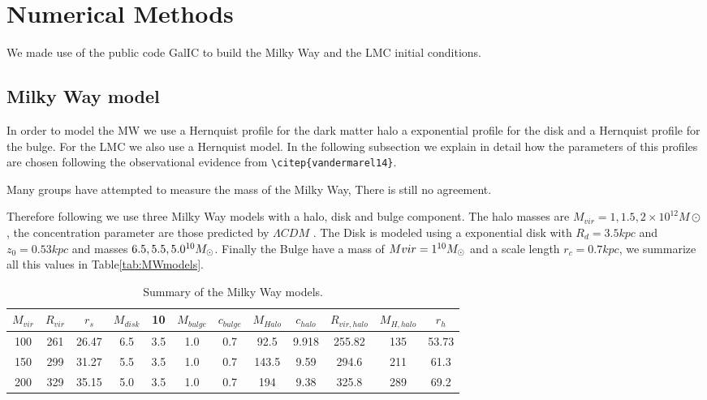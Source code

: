 \section{Numerical Methods}\label{sec:models}
We made use of the public code GalIC to build the Milky Way and the
LMC initial conditions.
\subsection{Milky Way model}


In order to model the MW we use a Hernquist profile for the dark matter halo 
a exponential profile for the disk and a Hernquist profile for the bulge. For
the LMC we also use a Hernquist model. In the following subsection we explain 
in detail how the parameters of this profiles are chosen following the observational 
evidence from \verb+\citep{vandermarel14}+. 


Many groups have attempted to measure the mass of the Milky Way,
There is still no agreement. 

Therefore following \citep{Gomez15} we use three Milky Way models with
a halo, disk and bulge component. The halo masses are $M_{vir} = 1, 1.5, 
2\times 10 ^12 M\odot$, the concentration parameter are those
predicted by $\Lambda CDM$ \citep{Kyplin}. The Disk is modeled using a 
exponential disk with $R_d=3.5kpc$ and $z_0 = 0.53 kpc$ and masses
$6.5, 5.5, 5.0 \time10^{10} M_{\odot}$.
Finally the Bulge have a mass of $Mvir=1\time10^{10}M_{\odot}$ and a
scale length $r_c=0.7 kpc$, we summarize all this values in
Table\ref{tab:MWmodels}.

\begin{table}[H]{\label{tab:MW}}
\begin{center}
\begin{tabular}{c c c c c c c c c c c c}
\hline
\hline
$M_{vir} $ & $R_{vir}$ & $r_s$ & $M_{disk}$ & 10 & $M_{bulge}$ & $c_{bulge} $ & $M_{Halo}$ & $c_{halo}$ & $R_{vir, halo}$ & $M_{H,halo}$ & $r_h $ \\
\hline
100 & 261 & 26.47 & 6.5 & 3.5 & 1.0 & 0.7 & 92.5 & 9.918 &  255.82 & 135 & 53.73 \\
150 & 299 & 31.27 & 5.5 & 3.5 & 1.0 & 0.7 & 143.5 & 9.59 & 294.6 & 211  & 61.3 \\
200 & 329 & 35.15 & 5.0 & 3.5 & 1.0 & 0.7 & 194 & 9.38 & 325.8 & 289 & 69.2 \\
\hline
\end{tabular}
\caption{Summary of the Milky Way models.}
\end{center}
\end{table}

